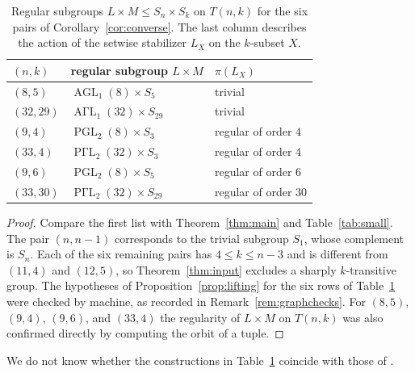 \documentclass[12pt,letterpaper]{article}
\numberwithin{equation}{section}
\theoremstyle{definition}
\DeclareMathOperator{\agll}{AGL}
\DeclareMathOperator{\pgll}{PGL}
\DeclareMathOperator{\agaml}{A\Gamma L}
\DeclareMathOperator{\pgaml}{P\Gamma L}
\begin{document}
\begin{table}[ht]
\centering\small
\begin{tabular}{@{}lll@{}}\toprule
$(n,k)$ & regular subgroup $L\times M$ & $\pi(L_X)$\\\midrule
$(8,5)$ & $\agll_1(8)\times S_5$ & trivial\\
$(32,29)$ & $\agaml_1(32)\times S_{29}$ & trivial\\
$(9,4)$ & $\pgll_2(8)\times S_3$ & regular of order $4$\\
$(33,4)$ & $\pgaml_2(32)\times S_3$ & regular of order $4$\\
$(9,6)$ & $\pgll_2(8)\times S_5$ & regular of order $6$\\
$(33,30)$ & $\pgaml_2(32)\times S_{29}$ & regular of order $30$\\
\bottomrule
\end{tabular}
\caption{Regular subgroups $L\times M\leq S_n\times S_k$ on $T(n,k)$ for the six pairs of Corollary~\ref{cor:converse}. The last column describes the action of the setwise stabilizer $L_X$ on the $k$-subset $X$.}\label{tab:sixexceptions}
\end{table}
\begin{proof}
Compare the first list with Theorem~\ref{thm:main} and Table~\ref{tab:small}. The pair $(n,n-1)$ corresponds to the trivial subgroup $S_1$, whose complement is $S_n$. Each of the six remaining pairs has $4\leq k\leq n-3$ and is different from $(11,4)$ and $(12,5)$, so Theorem~\ref{thm:input} excludes a sharply $k$-transitive group. The hypotheses of Proposition~\ref{prop:lifting} for the six rows of Table~\ref{tab:sixexceptions} were checked by machine, as recorded in Remark~\ref{rem:graphchecks}. For $(8,5)$, $(9,4)$, $(9,6)$, and $(33,4)$ the regularity of $L\times M$ on $T(n,k)$ was also confirmed directly by computing the orbit of a tuple.
\end{proof}
We do not know whether the constructions in Table~\ref{tab:sixexceptions} coincide with those of \cite{YFZG21}.
\end{document}
